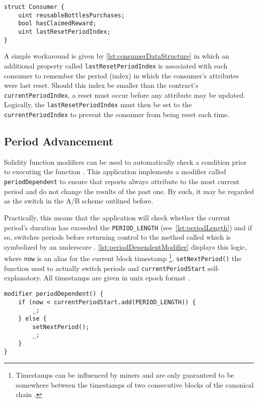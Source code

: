 \begin{lstlisting}[language=Solidity, caption=Consumer data structure, label=lst:consumerDataStructure]
struct Consumer {
	uint reusableBottlesPurchases;
	bool hasClaimedReward;
	uint lastResetPeriodIndex;
}
\end{lstlisting}

A simple workaround is given by \autoref{lst:consumerDataStructure} in which an additional property called \texttt{lastResetPeriodIndex} is associated with each consumer to remember the period (index) in which the consumer's attributes were last reset. Should this index be smaller than the contract's \texttt{currentPeriodIndex}, a reset must occur before any attribute may be updated. Logically, the \texttt{lastResetPeriodIndex} must then be set to the \texttt{currentPeriodIndex} to prevent the consumer from being reset each time.

\subsection{Period Advancement}
Solidity function modifiers can be used to automatically check a condition prior to executing the function \cite[p.~79]{solidityDocs}. This application implements a modifier called \texttt{periodDependent} to ensure that reports always attribute to the most current period and do not change the results of the past one. By such, it may be regarded as the switch in the A/B scheme outlined before.

Practically, this means that the application will check whether the current period's duration has exceeded the \texttt{PERIOD\_LENGTH} (see~\autoref{lst:periodLength}) and if so, switches periods before returning control to the method called which is symbolized by an underscore \cite[p.~81]{solidityDocs}. \autoref{lst:periodDependentModifier} displays this logic, where \texttt{now} is an alias for the current block timestamp \footnote{Timestamps can be influenced by miners and are only guaranteed to be somewhere between the timestamps of two consecutive blocks of the canonical chain \cite[p.~65]{solidityDocs}.}, \texttt{setNextPeriod()} the function used to actually switch periods and \texttt{currentPeriodStart} self-explanatory. All timestamps are given in unix epoch format \cite[p.~29]{solidityDocs}. 

\begin{lstlisting}[language=Solidity, caption=Function modifier to advance period, label=lst:periodDependentModifier]
modifier periodDependent() {	
	if (now < currentPeriodStart.add(PERIOD_LENGTH)) {
		_;
	} else {
		setNextPeriod();
		_;
	}
}
\end{lstlisting}

